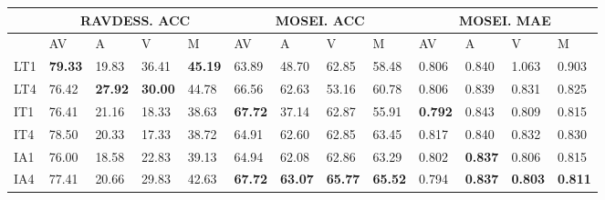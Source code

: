 \documentclass[a4paper,conference]{IEEEtran}
\begin{document}
\begin{table}[h]
\scriptsize

\setlength{\tabcolsep}{3pt}


\begin{tabular}{|p{12pt}|p{12pt}p{13pt}p{13pt}p{14pt}|p{12pt}p{13pt}p{13pt}p{14pt}|p{12pt}p{13pt}p{13pt}p{14pt}|}
\hline
\multicolumn{1}{|l|}{}         & \multicolumn{4}{c|}{RAVDESS. ACC}                                                      & \multicolumn{4}{c|}{MOSEI. ACC}                                                         & \multicolumn{4}{c|}{MOSEI. MAE}                                                        \\ \hline
\multicolumn{1}{|l|}{}   & AV             & A              & V              & {M}              & AV             & A              & V               & {M}              & AV             & A              & V              & {M}              \\
\multicolumn{1}{|l|}{LT1} &      \textbf{79.33}
          &        19.83
        &        36.41
        & \textbf{45.19}               & 63.89          & 48.70          & 62.85           & {58.48}          & 0.806          & 0.840          & 1.063          & {0.903}          \\
\multicolumn{1}{|l|}{LT4} & 76.42          & \textbf{27.92}          & \textbf{30.00}          & 44.78          & 66.56          & 62.63          & 53.16           & 60.78          & 0.806          & 0.839          & 0.831          & 0.825          \\
\multicolumn{1}{|l|}{IT1}    &76.41
         & 21.16
          & 18.33
         & 38.63      & \textbf{67.72} & 37.14          & 62.87           & 55.91         & \textbf{0.792} & 0.843          & 0.809          & 0.815 \\
\multicolumn{1}{|l|}{IT4}    &     78.50
           &       20.33
         &    17.33
            & 38.72               & 64.91          & 62.60          & 62.85           & 63.45        & 0.817          & 0.840          & 0.832          & 0.830         \\
\multicolumn{1}{|l|}{IA1}    &      76.00         &       18.58         &     22.83
           &
 39.13               & 64.94          & 62.08          & 62.86           & 63.29          & 0.802          & \textbf{0.837} & 0.806          & 0.815 \\
\multicolumn{1}{|l|}{IA4}    &     77.41
           &     20.66
           &      29.83
          & 42.63               & \textbf{67.72}          & \textbf{63.07}          & \textbf{65.77}           & \textbf{65.52}     & 0.794          & \textbf{0.837}          & \textbf{0.803}         & \textbf{0.811}      \\

\end{tabular}
\end{table}
\end{document}
